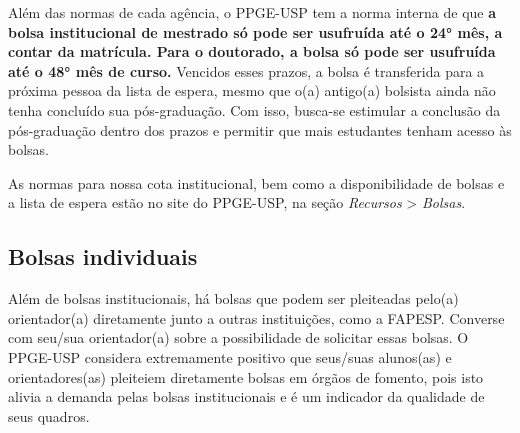 Além das normas de cada agência, o PPGE-USP tem a norma interna de que
\textbf{a bolsa institucional de mestrado só pode ser usufruída até o
  24° mês, a contar da matrícula. Para o doutorado, a bolsa só pode
  ser usufruída até o 48° mês de curso.} Vencidos esses prazos, a
bolsa é transferida para a próxima pessoa da lista de espera, mesmo
que o(a) antigo(a) bolsista ainda não tenha concluído sua
pós-graduação. Com isso, busca-se estimular a conclusão da
pós-graduação dentro dos prazos e permitir que mais estudantes tenham
acesso às bolsas.

As normas para nossa cota institucional, bem como a disponibilidade de
bolsas e a lista de espera estão no site do PPGE-USP, na seção
\emph{Recursos} \textgreater{} \emph{Bolsas}.

\subsection{Bolsas individuais}

Além de bolsas institucionais, há bolsas que podem ser pleiteadas
pelo(a) orientador(a) diretamente junto a outras instituições, como a
FAPESP. Converse com seu/sua orientador(a) sobre a possibilidade de
solicitar essas bolsas. O PPGE-USP considera extremamente positivo que
seus/suas alunos(as) e orientadores(as) pleiteiem diretamente bolsas
em órgãos de fomento, pois isto alivia a demanda pelas bolsas
institucionais e é um indicador da qualidade de seus
quadros.




